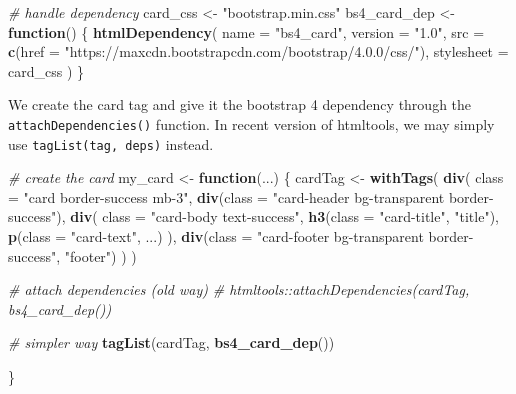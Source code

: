 \documentclass[]{book}
\newenvironment{Shaded}{\begin{snugshade}}{\end{snugshade}}
\newcommand{\CommentTok}[1]{\textcolor[rgb]{0.56,0.35,0.01}{\textit{#1}}}
\newcommand{\ControlFlowTok}[1]{\textcolor[rgb]{0.13,0.29,0.53}{\textbf{#1}}}
\newcommand{\DataTypeTok}[1]{\textcolor[rgb]{0.13,0.29,0.53}{#1}}
\newcommand{\KeywordTok}[1]{\textcolor[rgb]{0.13,0.29,0.53}{\textbf{#1}}}
\newcommand{\NormalTok}[1]{#1}
\newcommand{\StringTok}[1]{\textcolor[rgb]{0.31,0.60,0.02}{#1}}
\begin{document}
\begin{Shaded}
\begin{Highlighting}[]
\CommentTok{# handle dependency}
\NormalTok{card_css <-}\StringTok{ "bootstrap.min.css"}
\NormalTok{bs4_card_dep <-}\StringTok{ }\ControlFlowTok{function}\NormalTok{() \{}
  \KeywordTok{htmlDependency}\NormalTok{(}
    \DataTypeTok{name =} \StringTok{"bs4_card"}\NormalTok{,}
    \DataTypeTok{version =} \StringTok{"1.0"}\NormalTok{,}
    \DataTypeTok{src =} \KeywordTok{c}\NormalTok{(}\DataTypeTok{href =} \StringTok{"https://maxcdn.bootstrapcdn.com/bootstrap/4.0.0/css/"}\NormalTok{),}
    \DataTypeTok{stylesheet =}\NormalTok{ card_css}
\NormalTok{  )}
\NormalTok{\}}
\end{Highlighting}
\end{Shaded}

We create the card tag and give it the bootstrap 4 dependency through the \texttt{attachDependencies()} function. In recent version of htmltools, we may simply use
\texttt{tagList(tag,\ deps)} instead.

\begin{Shaded}
\begin{Highlighting}[]
\CommentTok{# create the card}
\NormalTok{my_card <-}\StringTok{ }\ControlFlowTok{function}\NormalTok{(...) \{}
\NormalTok{  cardTag <-}\StringTok{ }\KeywordTok{withTags}\NormalTok{(}
    \KeywordTok{div}\NormalTok{(}
      \DataTypeTok{class =} \StringTok{"card border-success mb-3"}\NormalTok{,}
      \KeywordTok{div}\NormalTok{(}\DataTypeTok{class =} \StringTok{"card-header bg-transparent border-success"}\NormalTok{),}
      \KeywordTok{div}\NormalTok{(}
        \DataTypeTok{class =} \StringTok{"card-body text-success"}\NormalTok{,}
        \KeywordTok{h3}\NormalTok{(}\DataTypeTok{class =} \StringTok{"card-title"}\NormalTok{, }\StringTok{"title"}\NormalTok{),}
        \KeywordTok{p}\NormalTok{(}\DataTypeTok{class =} \StringTok{"card-text"}\NormalTok{, ...)}
\NormalTok{      ),}
      \KeywordTok{div}\NormalTok{(}\DataTypeTok{class =} \StringTok{"card-footer bg-transparent border-success"}\NormalTok{, }\StringTok{"footer"}\NormalTok{)}
\NormalTok{    )}
\NormalTok{  )}
  
  \CommentTok{# attach dependencies (old way)}
  \CommentTok{# htmltools::attachDependencies(cardTag, bs4_card_dep())}
  
  \CommentTok{# simpler way}
  \KeywordTok{tagList}\NormalTok{(cardTag, }\KeywordTok{bs4_card_dep}\NormalTok{())}
  
\NormalTok{\}}
\end{Highlighting}
\end{Shaded}
\end{document}
